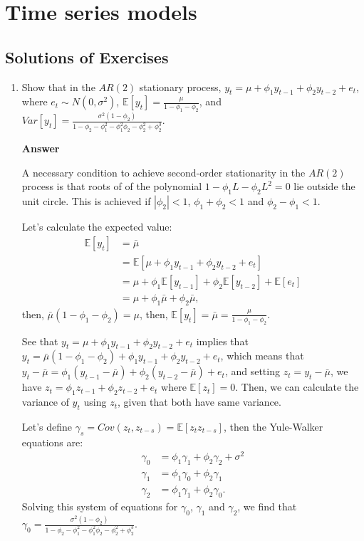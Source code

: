 \chapter{Time series models}\label{chap8}

\section{Solutions of Exercises}\label{sec81}
\begin{enumerate}[leftmargin=*]
	
	\item Show that in the $AR(2)$ stationary process, $y_t=\mu+\phi_1y_{t-1}+\phi_2y_{t-2}+e_t$, where $e_t\sim N(0,\sigma^2)$, $\mathbb{E}[y_t]=\frac{\mu}{1-\phi_1-\phi_2}$, and $Var[y_t]=\frac{\sigma^2(1-\phi_2)}{1-\phi_2-\phi_1^2-\phi_1^2\phi_2-\phi_2^2+\phi_2^3}$.
	
	\textbf{Answer}
	
	A necessary condition to achieve second-order stationarity in the $AR(2)$ process is that roots of of the polynomial $1-\phi_1L-\phi_2L^2=0$ lie outside the unit circle. This is achieved if $|\phi_2|<1$, $\phi_1+\phi_2<1$ and $\phi_2-\phi_1<1$.
	
	Let's calculate the expected value:
	\begin{align*}
		\mathbb{E}[y_t]&=\bar{\mu}\\
			&=\mathbb{E}[\mu+\phi_1y_{t-1}+\phi_2y_{t-2}+e_t]\\
			&=\mu+\phi_1\mathbb{E}[y_{t-1}]+\phi_2\mathbb{E}[y_{t-2}]+\mathbb{E}[e_{t}]\\
			&=\mu+\phi_1\bar{\mu}+\phi_2\bar{\mu},
	\end{align*}
then, $\bar{\mu}(1-\phi_1-\phi_2)=\mu$, then, $\mathbb{E}[y_t]=\bar{\mu}=\frac{\mu}{1-\phi_1-\phi_2}$.

See that $y_t=\mu+\phi_1y_{t-1}+\phi_2y_{t-2}+e_t$ implies that $y_t=\bar{\mu}(1-\phi_1-\phi_2)+\phi_1y_{t-1}+\phi_2y_{t-2}+e_t$, which means that $y_t-\bar{\mu}=\phi_1(y_{t-1}-\bar{\mu})+\phi_2(y_{t-2}-\bar{\mu})+e_t$, and setting $z_t=y_t-\bar{\mu}$, we have $z_t=\phi_1z_{t-1}+\phi_2z_{t-2}+e_t$ where $\mathbb{E}[z_t]=0$. Then, we can calculate the variance of $y_t$ using $z_t$, given that both have same variance.  

Let's define $\gamma_s=Cov(z_t,z_{t-s})=\mathbb{E}[z_tz_{t-s}]$, then the Yule-Walker equations are:
\begin{align*}
	\gamma_0&=\phi_1\gamma_1+\phi_2\gamma_2+\sigma^2\\
	\gamma_1&=\phi_1\gamma_0+\phi_2\gamma_1\\
	\gamma_2&=\phi_1\gamma_1+\phi_2\gamma_0.
\end{align*}  
Solving this system of equations for $\gamma_0$, $\gamma_1$ and $\gamma_2$, we find that $\gamma_0=\frac{\sigma^2(1-\phi_2)}{1-\phi_2-\phi_1^2-\phi_1^2\phi_2-\phi_2^2+\phi_2^3}$. 
	


\end{enumerate}
